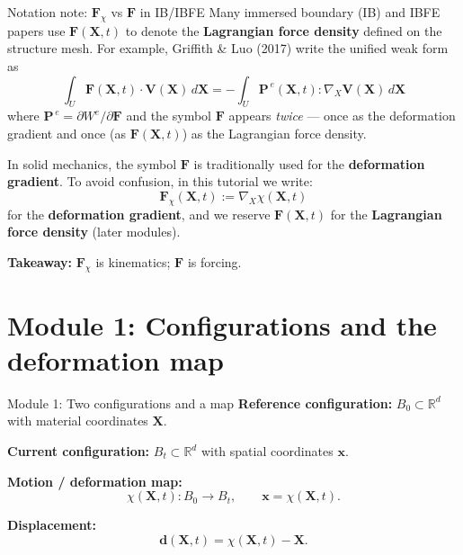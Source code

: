 \documentclass[aspectratio=169]{beamer}
\newcommand{\R}{\mathbb{R}}
\newcommand{\x}{\bm{x}}
\newcommand{\X}{\bm{X}}
\newcommand{\gradX}{\nabla_{\!X}}
\newcommand{\Fdef}{\bm{F}_{\chi}}  %
\newcommand{\Pten}{\bm{P}}         %
\newcommand{\FLag}{\bm{F}}         %
\begin{document}
\begin{frame}{Notation note: \(\Fdef\) vs \(\FLag\) in IB/IBFE}
\small
Many immersed boundary (IB) and IBFE papers use \(\FLag(\X,t)\) to denote the \textbf{Lagrangian force density}
defined on the structure mesh. For example, Griffith \& Luo (2017) write the unified weak form as
\[
\int_U \FLag(\X,t)\cdot\bm{V}(\X)\,d\X
= -\int_U \Pten^{\,e}(\X,t)\!:\!\gradX \bm{V}(\X)\,d\X
\]
where \(\Pten^{\,e}=\partial W^e/\partial \bm{F}\) and the symbol \(\bm{F}\) appears \emph{twice} --- once as the deformation gradient and once (as \(\bm{F}(\X,t)\)) as the Lagrangian force density.

\medskip
In solid mechanics, the symbol \(\bm{F}\) is traditionally used for the \textbf{deformation gradient}.
To avoid confusion, in this tutorial we write:
\[
\Fdef(\X,t) := \gradX \chi(\X,t)
\]
for the \textbf{deformation gradient}, and we reserve \(\FLag(\X,t)\) for the \textbf{Lagrangian force density}
(later modules).

\medskip
\textbf{Takeaway:} \(\Fdef\) is kinematics; \(\FLag\) is forcing.
\end{frame}

\section{Module 1: Configurations and the deformation map}

\begin{frame}{Module 1: Two configurations and a map}
\small
\textbf{Reference configuration:} \(B_0 \subset \R^d\) with material coordinates \(\X\).

\medskip
\textbf{Current configuration:} \(B_t \subset \R^d\) with spatial coordinates \(\x\).

\medskip
\textbf{Motion / deformation map:}
\[
\chi(\X,t): B_0 \to B_t, \qquad \x=\chi(\X,t).
\]

\medskip
\textbf{Displacement:}
\[
\bm{d}(\X,t) = \chi(\X,t) - \X.
\]

\medskip

\end{frame}

\end{document}
